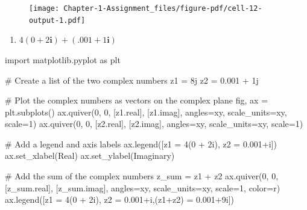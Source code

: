 \documentclass[
  letterpaper,
  DIV=11,
  numbers=noendperiod]{scrartcl}
\newenvironment{Shaded}{\begin{snugshade}}{\end{snugshade}}
\newcommand{\CommentTok}[1]{\textcolor[rgb]{0.37,0.37,0.37}{#1}}
\newcommand{\DecValTok}[1]{\textcolor[rgb]{0.68,0.00,0.00}{#1}}
\newcommand{\FloatTok}[1]{\textcolor[rgb]{0.68,0.00,0.00}{#1}}
\newcommand{\ImportTok}[1]{\textcolor[rgb]{0.00,0.46,0.62}{#1}}
\newcommand{\NormalTok}[1]{\textcolor[rgb]{0.00,0.23,0.31}{#1}}
\newcommand{\OperatorTok}[1]{\textcolor[rgb]{0.37,0.37,0.37}{#1}}
\newcommand{\OtherTok}[1]{\textcolor[rgb]{0.00,0.23,0.31}{#1}}
\newcommand{\StringTok}[1]{\textcolor[rgb]{0.13,0.47,0.30}{#1}}
\providecommand{\tightlist}{%
  \setlength{\itemsep}{0pt}\setlength{\parskip}{0pt}}\usepackage{longtable,booktabs,array}
\begin{document}
\begin{figure}[H]

{\centering \texttt{[image: Chapter-1-Assignment\_files/figure-pdf/cell-12-output-1.pdf]}

}

\end{figure}

\begin{enumerate}
\def\labelenumi{\alph{enumi}.}
\setcounter{enumi}{3}
\tightlist
\item
  \(4(0 + 2\mathbf i) + (.001 + 1\mathbf i)\)
\end{enumerate}

\begin{Shaded}
\begin{Highlighting}[numbers=left,,]
\ImportTok{import}\NormalTok{ matplotlib.pyplot }\ImportTok{as}\NormalTok{ plt}

\CommentTok{\# Create a list of the two complex numbers}
\NormalTok{z1 }\OperatorTok{=} \OtherTok{8j}
\NormalTok{z2 }\OperatorTok{=} \FloatTok{0.001} \OperatorTok{+} \OtherTok{1j}

\CommentTok{\# Plot the complex numbers as vectors on the complex plane}
\NormalTok{fig, ax }\OperatorTok{=}\NormalTok{ plt.subplots()}
\NormalTok{ax.quiver(}\DecValTok{0}\NormalTok{, }\DecValTok{0}\NormalTok{, [z1.real], [z1.imag], angles}\OperatorTok{=}\StringTok{\textquotesingle{}xy\textquotesingle{}}\NormalTok{, scale\_units}\OperatorTok{=}\StringTok{\textquotesingle{}xy\textquotesingle{}}\NormalTok{, scale}\OperatorTok{=}\DecValTok{1}\NormalTok{)}
\NormalTok{ax.quiver(}\DecValTok{0}\NormalTok{, }\DecValTok{0}\NormalTok{, [z2.real], [z2.imag], angles}\OperatorTok{=}\StringTok{\textquotesingle{}xy\textquotesingle{}}\NormalTok{, scale\_units}\OperatorTok{=}\StringTok{\textquotesingle{}xy\textquotesingle{}}\NormalTok{, scale}\OperatorTok{=}\DecValTok{1}\NormalTok{)}

\CommentTok{\# Add a legend and axis labels}
\NormalTok{ax.legend([}\StringTok{\textquotesingle{}z1 = 4(0 + 2i)\textquotesingle{}}\NormalTok{, }\StringTok{\textquotesingle{}z2 = 0.001+i\textquotesingle{}}\NormalTok{])}
\NormalTok{ax.set\_xlabel(}\StringTok{\textquotesingle{}Real\textquotesingle{}}\NormalTok{)}
\NormalTok{ax.set\_ylabel(}\StringTok{\textquotesingle{}Imaginary\textquotesingle{}}\NormalTok{)}

\CommentTok{\# Add the sum of the complex numbers}
\NormalTok{z\_sum }\OperatorTok{=}\NormalTok{ z1 }\OperatorTok{+}\NormalTok{ z2}
\NormalTok{ax.quiver(}\DecValTok{0}\NormalTok{, }\DecValTok{0}\NormalTok{, [z\_sum.real], [z\_sum.imag], angles}\OperatorTok{=}\StringTok{\textquotesingle{}xy\textquotesingle{}}\NormalTok{, scale\_units}\OperatorTok{=}\StringTok{\textquotesingle{}xy\textquotesingle{}}\NormalTok{, scale}\OperatorTok{=}\DecValTok{1}\NormalTok{, color}\OperatorTok{=}\StringTok{\textquotesingle{}r\textquotesingle{}}\NormalTok{)}
\NormalTok{ax.legend([}\StringTok{\textquotesingle{}z1 = 4(0 + 2i)\textquotesingle{}}\NormalTok{, }\StringTok{\textquotesingle{}z2 = 0.001+i\textquotesingle{}}\NormalTok{,}\StringTok{\textquotesingle{}(z1+z2) = 0.001+9i\textquotesingle{}}\NormalTok{])}


\end{Highlighting}
\end{Shaded}
\end{document}

